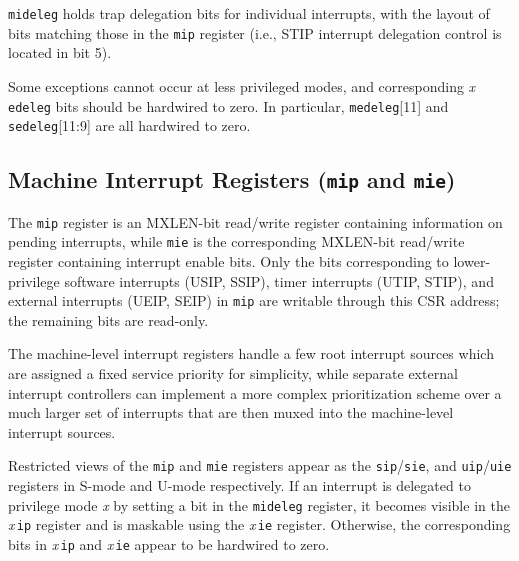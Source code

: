 {\tt mideleg} holds trap delegation bits for individual interrupts, with the
layout of bits matching those in the {\tt mip} register (i.e., STIP interrupt
delegation control is located in bit 5).

Some exceptions cannot occur at less privileged modes, and corresponding
{\em x}\,{\tt edeleg} bits should be hardwired to zero.  In particular,
{\tt medeleg}[11] and {\tt sedeleg}[11:9] are all hardwired to zero.

\subsection{Machine Interrupt Registers ({\tt mip} and {\tt mie})}

The {\tt mip} register is an MXLEN-bit read/write register containing
information on pending interrupts, while {\tt mie} is the
corresponding MXLEN-bit read/write register containing interrupt enable
bits.  Only the bits corresponding to lower-privilege software
interrupts (USIP, SSIP), timer interrupts (UTIP, STIP),
and external interrupts (UEIP, SEIP) in {\tt mip}
are writable through this CSR address; the remaining bits are
read-only.

\begin{commentary}
  The machine-level interrupt registers handle a few root interrupt
  sources which are assigned a fixed service priority for simplicity,
  while separate external interrupt controllers can implement a more
  complex prioritization scheme over a much larger set of interrupts
  that are then muxed into the machine-level interrupt sources.
\end{commentary}

Restricted views of the {\tt mip} and {\tt mie} registers appear as
the {\tt sip}/{\tt sie}, and {\tt uip}/{\tt uie} registers in 
S-mode and U-mode respectively.  If an interrupt is delegated to
privilege mode {\em x} by setting a bit in the {\tt mideleg} register,
it becomes visible in the {\em x}\,{\tt ip} register and is maskable
using the {\em x}\,{\tt ie} register.  Otherwise, the corresponding
bits in {\em x}\,{\tt ip} and {\em x}\,{\tt ie} appear to be hardwired
to zero.

